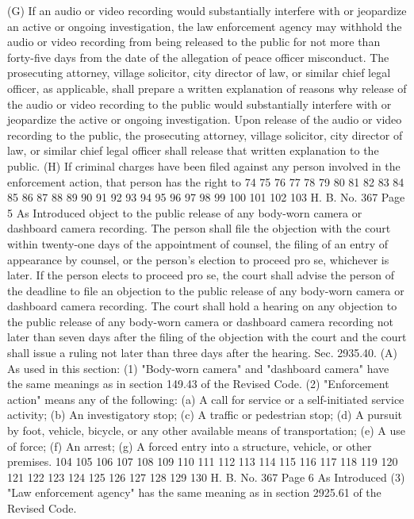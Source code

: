 (G) If an audio or video recording would substantially
interfere with or jeopardize an active or ongoing investigation,
the law enforcement agency may withhold the audio or video
recording from being released to the public for not more than
forty-five days from the date of the allegation of peace officer
misconduct. The prosecuting attorney, village solicitor, city
director of law, or similar chief legal officer, as applicable,
shall prepare a written explanation of reasons why release of
the audio or video recording to the public would substantially
interfere with or jeopardize the active or ongoing
investigation. Upon release of the audio or video recording to
the public, the prosecuting attorney, village solicitor, city
director of law, or similar chief legal officer shall release
that written explanation to the public.
(H) If criminal charges have been filed against any person
involved in the enforcement action, that person has the right to
74
75
76
77
78
79
80
81
82
83
84
85
86
87
88
89
90
91
92
93
94
95
96
97
98
99
100
101
102
103
H. B. No. 367 Page 5
As Introduced
object to the public release of any body-worn camera or
dashboard camera recording. The person shall file the objection
with the court within twenty-one days of the appointment of
counsel, the filing of an entry of appearance by counsel, or the
person's election to proceed pro se, whichever is later. If the
person elects to proceed pro se, the court shall advise the
person of the deadline to file an objection to the public
release of any body-worn camera or dashboard camera recording.
The court shall hold a hearing on any objection to the public
release of any body-worn camera or dashboard camera recording
not later than seven days after the filing of the objection with
the court and the court shall issue a ruling not later than
three days after the hearing.
 Sec. 2935.40. (A) As used in this section:
(1) "Body-worn camera" and "dashboard camera" have the
same meanings as in section 149.43 of the Revised Code.
(2) "Enforcement action" means any of the following:
(a) A call for service or a self-initiated service
activity;
(b) An investigatory stop;
(c) A traffic or pedestrian stop;
(d) A pursuit by foot, vehicle, bicycle, or any other
available means of transportation;
(e) A use of force;
(f) An arrest;
(g) A forced entry into a structure, vehicle, or other
premises.
104
105
106
107
108
109
110
111
112
113
114
115
116
117
118
119
120
121
122
123
124
125
126
127
128
129
130
H. B. No. 367 Page 6
As Introduced
(3) "Law enforcement agency" has the same meaning as in
section 2925.61 of the Revised Code.
